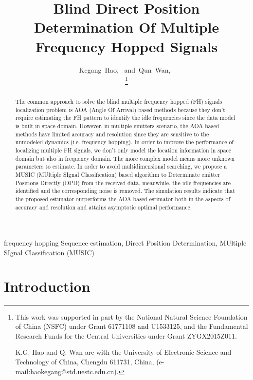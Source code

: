 \documentclass[journal,10pt]{IEEEtran}
\begin{document}
\title{Blind Direct Position Determination Of Multiple Frequency Hopped Signals}

\author{Kegang~Hao,~
        and~Qun~Wan,~
        
\thanks{This work was supported in part by the National Natural Science Foundation of China (NSFC) under Grant 61771108 and U1533125, and the Fundamental Research Funds for the Central Universities under Grant ZYGX2015Z011.

    K.G. Hao and Q. Wan are with the University of Electronic Science and Technology of China, Chengdu 611731, China, (e-mail:haokegang@std.uestc.edu.cn).}
}

\maketitle

\begin{abstract}
The common approach to solve the blind multiple frequency hopped (FH) signals localization problem is AOA (Angle Of Arrival) based methods because
they don't require estimating the FH pattern to identify the idle frequencies since the data model is built in space domain.
However, in multiple emitters scenario, the AOA based methods have limited accuracy and resolution since they are sensitive to the unmodeled dynamics (i.e. frequency hopping).
In order to improve the performance of localizing multiple FH signals, we don't only model the location information in space domain but also in frequency domain.
The more complex model means more unknown parameters to estimate. In order to avoid multidimensional searching, 
we propose a MUSIC (MUltiple SIgnal Classification) based algorithm to Determinate emitter Positions Directly (DPD) from the received data, meanwhile, the idle frequencies are identified and the corresponding noise is removed. 
The simulation results indicate that the proposed estimator outperforms the AOA based estimator both in the aspects of accuracy and resolution and attains asymptotic optimal performance.  
\end{abstract}

\begin{IEEEkeywords}
frequency hopping Sequence estimation, Direct Position Determination, MUltiple SIgnal Classification (MUSIC) 
\end{IEEEkeywords}


\IEEEpeerreviewmaketitle


\section{Introduction}
\label{sec:intro}
\end{document}
